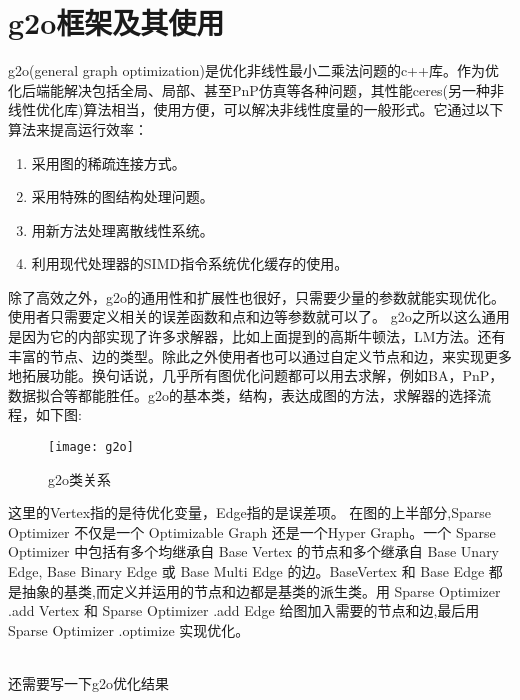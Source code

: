 \section{g2o框架及其使用}
g2o(general graph optimization)是优化非线性最小二乘法问题的c++库。作为优化后端能解决包括全局、局部、甚至PnP仿真等各种问题，其性能ceres(另一种非线性优化库)算法相当，使用方便，可以解决非线性度量的一般形式。它通过以下算法来提高运行效率：
\begin{enumerate}[(1)]
	\item 采用图的稀疏连接方式。
	\item 采用特殊的图结构处理问题。
	\item 用新方法处理离散线性系统。
	\item 利用现代处理器的SIMD指令系统优化缓存的使用。
\end{enumerate}
\par
除了高效之外，g2o的通用性和扩展性也很好，只需要少量的参数就能实现优化。使用者只需要定义相关的误差函数和点和边等参数就可以了。
g2o之所以这么通用是因为它的内部实现了许多求解器，比如上面提到的高斯牛顿法，LM方法。还有丰富的节点、边的类型。除此之外使用者也可以通过自定义节点和边，来实现更多地拓展功能。换句话说，几乎所有图优化问题都可以用去求解，例如BA，PnP，数据拟合等都能胜任。g2o的基本类，结构，表达成图的方法，求解器的选择流程，如下图:\par
\begin{figure}[H]
	\centering
	\texttt{[image: g2o]}
	\caption{g2o类关系}
\end{figure}
这里的Vertex指的是待优化变量，Edge指的是误差项。
在图的上半部分,Sparse Optimizer 不仅是一个 Optimizable Graph 还是一个Hyper Graph。一个 Sparse Optimizer 中包括有多个均继承自 Base Vertex 的节点和多个继承自 Base Unary Edge, Base Binary Edge 或 Base Multi Edge 的边。BaseVertex 和 Base Edge 都是抽象的基类,而定义并运用的节点和边都是基类的派生类。用 Sparse Optimizer .add Vertex 和 Sparse Optimizer .add Edge 给图加入需要的节点和边,最后用 Sparse Optimizer .optimize 实现优化。




\\还需要写一下g2o优化结果



















